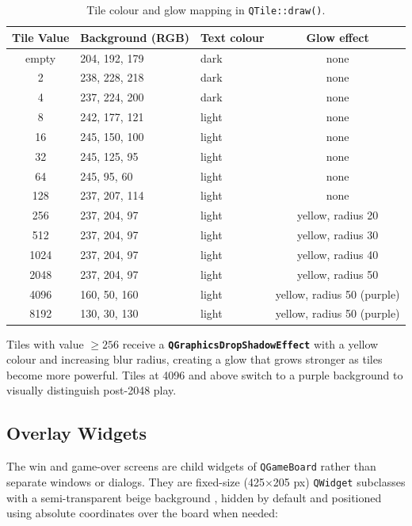 \documentclass[a4paper,12pt]{article}
\begin{document}
\begin{table}[H]
\centering
\begin{tabular}{@{}cllc@{}}
\toprule
\textbf{Tile Value} & \textbf{Background (RGB)} & \textbf{Text colour} & \textbf{Glow effect} \\
\midrule
empty & 204, 192, 179 & dark  & none \\
2     & 238, 228, 218 & dark  & none \\
4     & 237, 224, 200 & dark  & none \\
8     & 242, 177, 121 & light & none \\
16    & 245, 150, 100 & light & none \\
32    & 245, 125, 95  & light & none \\
64    & 245, 95, 60   & light & none \\
128   & 237, 207, 114 & light & none \\
256   & 237, 204, 97  & light & yellow, radius 20 \\
512   & 237, 204, 97  & light & yellow, radius 30 \\
1024  & 237, 204, 97  & light & yellow, radius 40 \\
2048  & 237, 204, 97  & light & yellow, radius 50 \\
4096  & 160, 50, 160  & light & yellow, radius 50 (purple) \\
8192  & 130, 30, 130  & light & yellow, radius 50 (purple) \\
\bottomrule
\end{tabular}
\caption{Tile colour and glow mapping in \texttt{QTile::draw()}.}
\end{table}

Tiles with value $\geq 256$ receive a \textbf{\texttt{QGraphicsDropShadowEffect}} with a yellow colour and increasing blur radius, creating a glow that grows stronger as tiles become more powerful. Tiles at 4096 and above switch to a purple background to visually distinguish post-2048 play.

\subsection{Overlay Widgets}

The win and game-over screens are child widgets of \texttt{QGameBoard} rather than separate windows or dialogs. They are fixed-size (425$\times$205 px) \texttt{QWidget} subclasses with a semi-transparent beige background , hidden by default and positioned using absolute coordinates over the board when needed:
\end{document}
